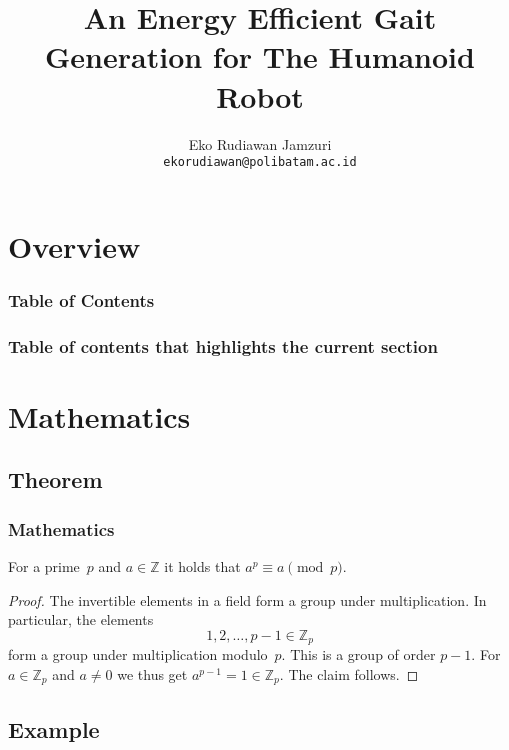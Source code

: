 \documentclass[UKenglish]{beamer}
\author[E.R. Jamzuri]{Eko Rudiawan Jamzuri\\\texttt{ekorudiawan@polibatam.ac.id}}
\institute{National Taiwan Normal University, Taipei, Taiwan}
\title[An Energy Efficient Gait]{An Energy Efficient Gait Generation for The Humanoid Robot}
\begin{document}
\section{Overview}

%
%

\begin{frame}
    \frametitle{Table of Contents}
    \tableofcontents
\end{frame}

\begin{frame}
    \frametitle{Table of contents that highlights the current section}
    \tableofcontents[currentsection]
\end{frame}

\section{Mathematics}
\subsection{Theorem}

\begin{frame}
    \frametitle{Mathematics}

    \begin{theorem}
        For a prime~\(p\) and \(a \in \mathbb{Z}\) it holds that \(a^p \equiv a \pmod{p}\).
    \end{theorem}

    \begin{proof}
        The invertible elements in a field form a group under multiplication.
        In particular, the elements
        \begin{equation*}
            1, 2, \ldots, p - 1 \in \mathbb{Z}_p
        \end{equation*}
        form a group under multiplication modulo~\(p\).
        This is a group of order \(p - 1\).
        For \(a \in \mathbb{Z}_p\) and \(a \neq 0\) we thus get \(a^{p-1} = 1 \in \mathbb{Z}_p\).
        The claim follows.
    \end{proof}
\end{frame}

\subsection{Example}
\end{document}
